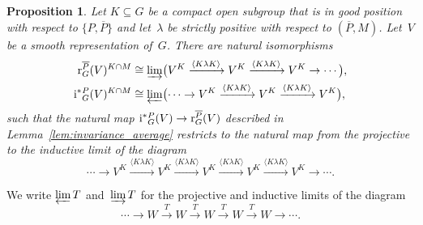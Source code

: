 \documentclass{amsart}
\newtheorem{proposition}[theorem]{Proposition}
\theoremstyle{remark}
\theoremstyle{definition}
\newcommand*{\Jact}{\textup i^*{}}%
\newcommand*{\Jacr}{\textup r}%
\newcommand*{\idem}[1]{\langle#1\rangle}%
\newcommand*{\opp}[1]{\overline{#1}}%
\newcommand*{\Op}{T}%
\begin{document}
\begin{proposition}
  \label{pro:Jacquet_as_limit}
  Let \(K\subseteq G\) be a compact open subgroup that is in good position with respect to \(\{P,\opp{P}\}\) and let~\(\lambda\) be strictly positive with respect to \((\opp{P},M)\).  Let~\(V\) be a smooth representation of~\(G\).  There are natural isomorphisms
  \begin{align*}
    \Jacr_G^{\opp{P}}(V)^{K \cap M} &\cong \varinjlim \bigl(
    V^K \xrightarrow{\idem{K \lambda K}}
    V^K \xrightarrow{\idem{K \lambda K}}
    V^K \to \dotsb\bigr),\\
    \Jact_G^P(V)^{K \cap M} &\cong \varprojlim \bigl(\dotsb\to
    V^K \xrightarrow{\idem{K \lambda K}}
    V^K \xrightarrow{\idem{K \lambda K}}
    V^K\bigr),
  \end{align*}
  such that the natural map \(\Jact_G^P(V)\to \Jacr_G^{\opp{P}}(V)\) described in Lemma~\textup{\ref{lem:invariance_average}} restricts to the natural map from the projective to the inductive limit of the diagram
  \begin{equation}
    \label{eq:proj_injlim_diagram}
    \dotsb \to
    V^K \xrightarrow{\idem{K \lambda K}}
    V^K \xrightarrow{\idem{K \lambda K}}
    V^K \xrightarrow{\idem{K \lambda K}}
    V^K \xrightarrow{\idem{K \lambda K}}
    V^K \to \dotsb.
  \end{equation}
\end{proposition}

We write \(\varprojlim \Op\) and~\(\varinjlim \Op\) for the projective and inductive limits of the diagram
\begin{equation}
  \label{eq:constant_diagram}
  \dotsb \to W \xrightarrow{\Op} W \xrightarrow{\Op} W
  \xrightarrow{\Op} W \xrightarrow{\Op} W \to \dotsb.
\end{equation}
\end{document}
